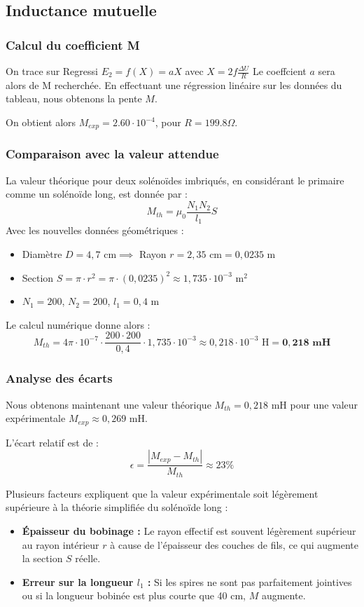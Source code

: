 \documentclass[a4paper,9pt,french]{scrartcl}
\begin{document}
\subsection{Inductance mutuelle}

\subsubsection{Calcul du coefficient M}
On trace sur Regressi $E_2 = f(X) = a X$ avec $X = 2f\frac{\Delta U}{R}$ Le coeffcient $a$ sera alors de M recherchée.
En effectuant une régression linéaire sur les données du tableau, nous obtenons la pente $M$.

On obtient alors $M_{exp} = 2.60\cdot 10^{-4}$, pour $R = 199.8\Omega$.

\subsubsection{Comparaison avec la valeur attendue}
La valeur théorique pour deux solénoïdes imbriqués, en considérant le primaire comme un solénoïde long, est donnée par :
$$M_{th} = \mu_0 \frac{N_1 N_2}{l_1} S$$
Avec les nouvelles données géométriques :
\begin{itemize}
    \item Diamètre $D = 4,7 \text{ cm} \implies$ Rayon $r = 2,35 \text{ cm} = 0,0235 \text{ m}$
    \item Section $S = \pi \cdot r^2 = \pi \cdot (0,0235)^2 \approx 1,735 \cdot 10^{-3} \text{ m}^2$
    \item $N_1 = 200$, $N_2 = 200$, $l_1 = 0,4 \text{ m}$
\end{itemize}

Le calcul numérique donne alors :
$$M_{th} = 4\pi \cdot 10^{-7} \cdot \frac{200 \cdot 200}{0,4} \cdot 1,735 \cdot 10^{-3} \approx 0,218 \cdot 10^{-3} \text{ H} = \mathbf{0,218 \text{ mH}}$$

\subsubsection{Analyse des écarts}
Nous obtenons maintenant une valeur théorique $M_{th} = 0,218 \text{ mH}$ pour une valeur expérimentale $M_{exp} \approx 0,269 \text{ mH}$. 

L'écart relatif est de :
$$\epsilon = \frac{|M_{exp} - M_{th}|}{M_{th}} \approx 23\%$$

Plusieurs facteurs expliquent que la valeur expérimentale soit légèrement supérieure à la théorie simplifiée du solénoïde long :
\begin{itemize}
    \item \textbf{Épaisseur du bobinage :} Le rayon effectif est souvent légèrement supérieur au rayon intérieur $r$ à cause de l'épaisseur des couches de fils, ce qui augmente la section $S$ réelle.
    \item \textbf{Erreur sur la longueur $l_1$ :} Si les spires ne sont pas parfaitement jointives ou si la longueur bobinée est plus courte que 40 cm, $M$ augmente.
    \end{itemize}
\end{document}
